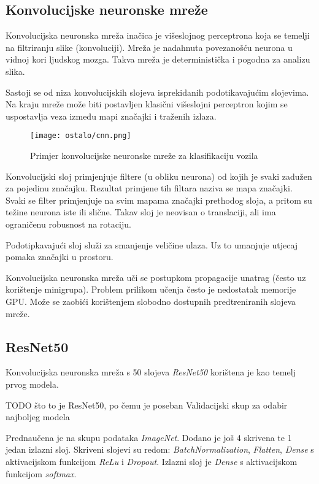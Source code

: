 \documentclass[conference, utf8]{IEEEtran}
\begin{document}
\subsection{Konvolucijske neuronske mreže}
Konvolucijska neuronska mreža inačica je višeslojnog perceptrona koja se temelji na filtriranju slike (konvoluciji). Mreža je nadahnuta povezanošću neurona u vidnoj kori ljudskog mozga.  Takva mreža je deterministička i pogodna za analizu slika. 

Sastoji se od niza konvolucijskih slojeva isprekidanih podotikavajućim slojevima. Na kraju mreže može biti postavljen klasični višeslojni perceptron kojim se uspostavlja veza između mapi značajki i traženih izlaza. 

\begin{figure}[ht]
	\centering
	\texttt{[image: ostalo/cnn.png]}
	\caption{Primjer konvolucijske neuronske mreže za klasifikaciju vozila}
	\label{fig:cnn}
\end{figure}

Konvolucijski sloj primjenjuje filtere (u obliku neurona) od kojih je svaki zadužen za pojedinu značajku. Rezultat primjene tih filtara naziva se mapa značajki. Svaki se filter primjenjuje na svim mapama značajki prethodog sloja, a pritom su težine neurona iste ili slične. Takav sloj je neovisan o translaciji, ali ima ograničenu robusnost na rotaciju. 

Podotipkavajući sloj služi za smanjenje veličine ulaza. Uz to umanjuje utjecaj pomaka značajki u prostoru.

Konvolucijska neuronska mreža uči se postupkom propagacije unatrag (često uz korištenje minigrupa). Problem prilikom učenja često je nedostatak memorije GPU. Može se zaobići korištenjem slobodno dostupnih predtreniranih slojeva mreže.






\subsection{ResNet50}
Konvolucijska neuronska mreža s 50 slojeva \textit{ResNet50} korištena je kao temelj prvog modela.



TODO što to je ResNet50, po čemu je poseban
Validacijski skup za odabir najboljeg modela



 Prednaučena je na skupu podataka \textit{ImageNet}. Dodano je još 4 skrivena te 1 jedan izlazni sloj. Skriveni slojevi su redom: \textit{BatchNormalization}, \textit{Flatten}, \textit{Dense} s aktivacijskom funkcijom \textit{ReLu} i \textit{Dropout}. Izlazni sloj je \textit{Dense} s aktivacijskom funkcijom \textit{softmax}.
\end{document}
